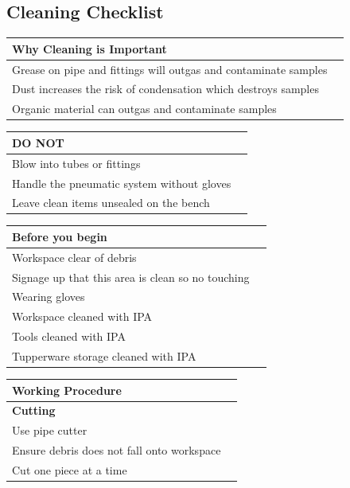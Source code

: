 \documentclass[a4paper,12pt,oneside]{article}
\begin{document}
\begin{appendices}
\begin{longtable} {|m{}|m{}|m{}|}
\end{longtable}

\subsection{Cleaning Checklist}
\begin{longtable}{|m{}|m{}|} \hline
\textbf{Why Cleaning is Important} &  \\ \hline
Grease  on  pipe  and  fittings  will  outgas  and  contaminate  samples  & \\ \hline
Dust  increases  the  risk  of  condensation  which  destroys  samples  & \\ \hline
Organic  material  can  outgas  and  contaminate  samples &  \\ \hline
\end{longtable}
\begin{longtable}{|m{}|m{}|} \hline
\textbf{DO  NOT } &    \\ \hline
Blow  into  tubes  or  fittings  &   \\ \hline
Handle  the  pneumatic  system  without  gloves  &   \\ \hline
Leave  clean  items  unsealed  on  the  bench      &     \\ \hline
\end{longtable}
\begin{longtable}{|m{}|m{}|} \hline
\textbf{Before  you  begin}   &   \\ \hline
Workspace  clear  of  debris    &   \\ \hline
Signage  up  that  this  area  is  clean  so  no  touching   &  \\ \hline
Wearing  gloves &   \\ \hline
Workspace  cleaned  with  IPA  &  \\ \hline
Tools  cleaned  with  IPA     &    \\ \hline
Tupperware  storage  cleaned  with  IPA   &  \\ \hline
\end{longtable}
\begin{longtable}{|m{}|m{}|} \hline
\textbf{Working  Procedure }  &   \\ \hline

\textbf{Cutting}   & \\ \hline
Use  pipe  cutter   &   \\ \hline
Ensure  debris  does  not  fall  onto  workspace    & \\ \hline
Cut  one  piece  at  a  time   &  \\ \hline


\end{longtable}
\end{appendices}
\end{document}

